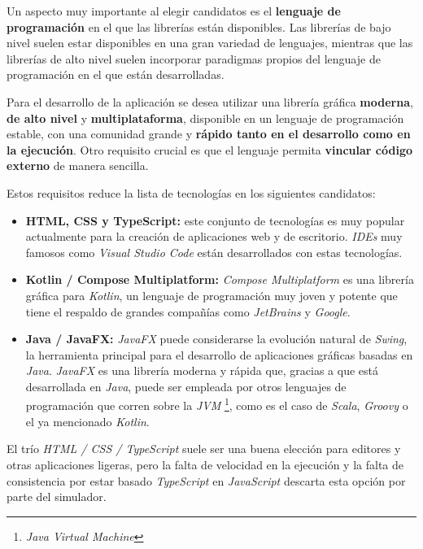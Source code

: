 \noindent Un aspecto muy importante al elegir candidatos es el \textbf{lenguaje de programación}
en el que las librerías están disponibles.
Las librerías de bajo nivel suelen estar disponibles en una gran variedad de lenguajes, mientras que las
librerías de alto nivel suelen incorporar paradigmas propios del lenguaje de programación en el que están
desarrolladas.

\noindent Para el desarrollo de la aplicación se desea utilizar una librería gráfica \textbf{moderna},
\textbf{de alto nivel} y \textbf{multiplataforma}, disponible en un lenguaje de programación estable,
con una comunidad grande y \textbf{rápido tanto en el desarrollo como en la ejecución}.
Otro requisito crucial es que el lenguaje permita \textbf{vincular código externo} de manera
sencilla.

\noindent Estos requisitos reduce la lista de tecnologías en los siguientes candidatos:
\begin{itemize}
    \item \textbf{HTML, CSS y TypeScript:} este conjunto de tecnologías es muy popular actualmente
    para la creación de aplicaciones web y de escritorio. \textit{IDEs} muy famosos como
    \textit{Visual Studio Code} están desarrollados con estas tecnologías.
    \item \textbf{Kotlin / Compose Multiplatform:} \textit{Compose Multiplatform} es una librería gráfica
    para \textit{Kotlin}, un lenguaje de programación muy joven y potente que tiene el respaldo de
    grandes compañías como \textit{JetBrains} y \textit{Google}.
    \item \textbf{Java / JavaFX:} \textit{JavaFX} puede considerarse la evolución natural de \textit{Swing},
    la herramienta principal para el desarrollo de aplicaciones gráficas basadas en \textit{Java}.
    \textit{JavaFX} es una librería moderna y rápida que, gracias a que está desarrollada en \textit{Java},
    puede ser empleada por otros lenguajes de programación que corren sobre la \textit{JVM}
    \footnote{\textit{Java Virtual Machine}}, como es el caso de \textit{Scala}, \textit{Groovy} o el ya mencionado
    \textit{Kotlin}.
\end{itemize}

\noindent El trío \textit{HTML / CSS / TypeScript} suele ser una buena elección para editores y otras
aplicaciones ligeras, pero la falta de velocidad en la ejecución y la falta de consistencia por estar
basado \textit{TypeScript} en \textit{JavaScript} descarta esta opción por parte del simulador.

